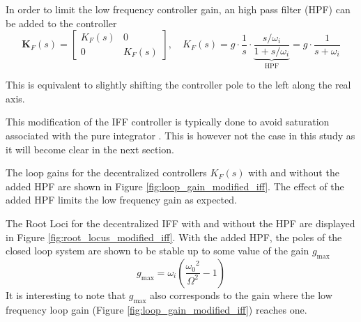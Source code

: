 \documentclass{ISMA_USD2020}
\begin{document}
In order to limit the low frequency controller gain, an high pass filter (HPF) can be added to the controller
\begin{equation}
\label{eq:IFF_LHF}
  \bm{K}_F(s) = \begin{bmatrix} K_F(s) & 0 \\ 0 & K_F(s) \end{bmatrix}, \quad K_{F}(s) = g \cdot \frac{1}{s} \cdot \underbrace{\frac{s/\omega_i}{1 + s/\omega_i}}_{\text{HPF}} = g \cdot \frac{1}{s + \omega_i}
\end{equation}

This is equivalent to slightly shifting the controller pole to the left along the real axis.

This modification of the IFF controller is typically done to avoid saturation associated with the pure integrator \cite{preumont91_activ}.
This is however not the case in this study as it will become clear in the next section.

\par
The loop gains for the decentralized controllers \(K_F(s)\) with and without the added HPF are shown in Figure \ref{fig:loop_gain_modified_iff}.
The effect of the added HPF limits the low frequency gain as expected.

The Root Loci for the decentralized IFF with and without the HPF are displayed in Figure \ref{fig:root_locus_modified_iff}.
With the added HPF, the poles of the closed loop system are shown to be stable up to some value of the gain \(g_\text{max}\)
\begin{equation}
\label{eq:gmax_iff_hpf}
  g_{\text{max}} = \omega_i \left( \frac{{\omega_0}^2}{\Omega^2} - 1 \right)
\end{equation}
It is interesting to note that \(g_{\text{max}}\) also corresponds to the gain where the low frequency loop gain (Figure \ref{fig:loop_gain_modified_iff}) reaches one.
\end{document}
